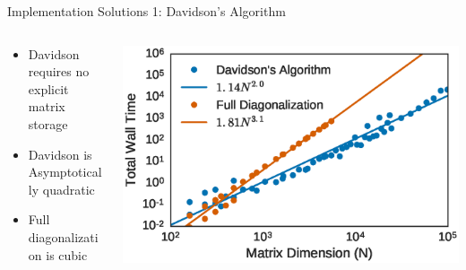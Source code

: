 \documentclass[10pt]{beamer}
\begin{document}
{{{{{{{{{{\begin{frame}{Implementation Solutions 1: Davidson's Algorithm}
	\begin{columns}[c] %
		\begin{column}{.4\textwidth}
			\begin{itemize}
			  \item {Davidson requires no explicit matrix storage}
				\item {Davidson is Asymptotically quadratic}
				\item {Full diagonalization is cubic}
			\end{itemize}
		\end{column}
		\begin{column}{0.7\textwidth}
				\vspace{10mm}
		    \begin{overprint}
			    \includegraphics[width=\linewidth]{../figures/dav_vs_exact_scaling.eps}
			\end{overprint}
		\end{column}
	\end{columns}
\end{frame}

}}}}}}}}}}
\end{document}
